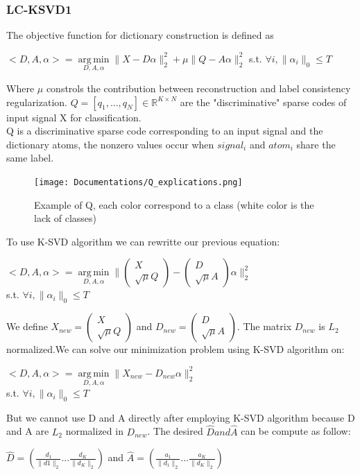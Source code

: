 \documentclass[a4paper,10pt]{article}
\newcommand{\R}{\mathbb{R}}
\DeclareMathOperator*{\argmin}{arg\,min}
\begin{document}
\subsubsection{LC-KSVD1}
The objective function for dictionary construction is  defined as
\begin{center}
 $<D,A,\alpha> = \underset{D,A,\alpha}{\argmin} \| X - D\alpha \|^2_2 + \mu \|Q -A\alpha\|^2_2$  s.t. $\forall i, \|\alpha_i\|_0 \leq T$
\end{center}

Where $\mu$ constrols the contribution between reconstruction and label consistency regularization. $Q = [q_1,...,q_N] \in \R^{K \times N}$ are the "discriminative" sparse codes of input signal X for classification.\\
Q is a discriminative sparse code corresponding to an input signal and the dictionary atoms, the nonzero values occur when $signal_i$ and $atom_i$ share the same label.
\begin{figure}[h]
 \centering
 \texttt{[image: Documentations/Q\_explications.png]}
 \caption{Example of Q, each color correspond to a class (white color  is the lack of classes)}
\end{figure}
To use K-SVD algorithm we can rewritte our previous equation:
\begin{center}
$ <D,A,\alpha> = \underset{D,A,\alpha}{\argmin} \| \begin{pmatrix} 
X  \\
\sqrt{\mu}Q
\end{pmatrix} -  \begin{pmatrix} 
D  \\
\sqrt{\mu}A
\end{pmatrix}\alpha \|^2_2 $  \\ \vspace{0.5cm} s.t. $\forall i, \|\alpha_i\|_0 \leq T $
\end{center}
We define $X_{new}  =  \begin{pmatrix} 
X  \\
\sqrt{\mu}Q
\end{pmatrix}$ and $D_{new} =  \begin{pmatrix} 
D  \\
\sqrt{\mu}A
\end{pmatrix}$. The matrix $D_{new}$ is $L_2$ normalized.We can solve our minimization problem using K-SVD algorithm on:
\begin{center}
 $<D,A,\alpha> = \underset{D,A,\alpha}{\argmin} \| X_{new} - D_{new}\alpha \|^2_2$ \\  \vspace{0.5cm}s.t. $\forall i, \|\alpha_i\|_0 \leq T$
\end{center}
But  we cannot use D and A  directly after employing K-SVD algorithm because D and A are $L_2$ normalized in $D_{new}$. The desired $\hat{D} and \hat{A}$ can be compute as follow:\vspace{0.5cm}\begin{center}
$\hat{D} = (
\frac{d_1}{\|d1\|_2}  ...  \frac{d_K}{\|d_K\|_2} 
)$   and $\hat{A} =
(\frac{a_1}{\|d_1\|_2}  ...  \frac{a_K}{\|d_K\|_2} 
)$
\end{center}
\end{document}
